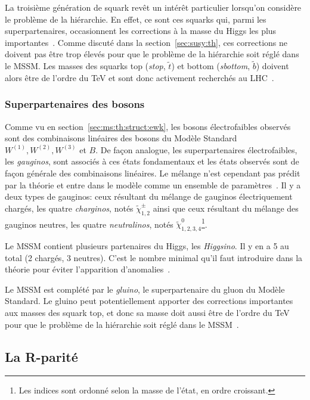 La troisième génération de squark revêt un intérêt particulier
lorsqu'on considère le problème de la hiérarchie. En effet, ce sont
ces squarks qui, parmi les superpartenaires, occasionnent les
corrections à la masse du Higgs les plus
importantes~\cite{olive_susy2_2014}. Comme discuté dans la
section~\ref{sec:susy:th}, ces corrections 
ne doivent pas être trop élevés pour que le
problème de la hiérarchie soit réglé dans le MSSM. Les masses des
squarks top (\emph{stop}, $\tilde{t}$) et bottom (\emph{sbottom},
$\tilde{b}$) doivent alors être de l'ordre du TeV et sont donc
activement recherchés au LHC~\cite{ATLAS-CONF-2015-067}.

\subsubsection{Superpartenaires des bosons}
Comme vu en section~\ref{sec:ms:th:struct:ewk}, les bosons
électrofaibles observés sont des combinaisons linéaires des bosons du
Modèle Standard $W^{(1)}, W^{(2)}, W^{(3)}$ et $B$. De façon analogue,
les superpartenaires électrofaibles, les \emph{gauginos}, sont
associés à ces états fondamentaux et les états observés sont de façon
générale des combinaisons linéaires. Le mélange n'est cependant pas
prédit par la théorie et entre dans le modèle comme un ensemble de
paramètres~\cite{olive_susy1_2014}. Il y a deux types de gauginos:
ceux résultant du mélange de gauginos électriquement chargés, les
quatre \emph{charginos}, notés $\tilde{\chi}_{1,2}^\pm$ ainsi que ceux
résultant du mélange des gauginos neutres, les quatre
\emph{neutralinos}, notés $\tilde{\chi}_{1,2,3,4}^0$\footnote{Les
  indices sont ordonné selon la masse de l'état, en ordre
  croissant.}\cite{aad_summary_2015}.

Le MSSM contient plusieurs partenaires du Higgs, les
\emph{Higgsino}. Il y en a 5 au total (2 chargés, 3 neutres). C'est le
nombre minimal qu'il faut introduire dans la théorie pour éviter
l'apparition d'anomalies~\cite{olive_susy1_2014}.

Le MSSM est complété par le \emph{gluino}, le superpartenaire du gluon
du Modèle Standard. Le gluino peut potentiellement apporter des
corrections importantes aux masses des squark top, et donc sa masse
doit aussi être de l'ordre du TeV pour que le problème de la
hiérarchie soit réglé dans le MSSM~\cite{ATLAS-CONF-2015-067}.

\subsection{La R-parité}
\label{sec:susy:R}

